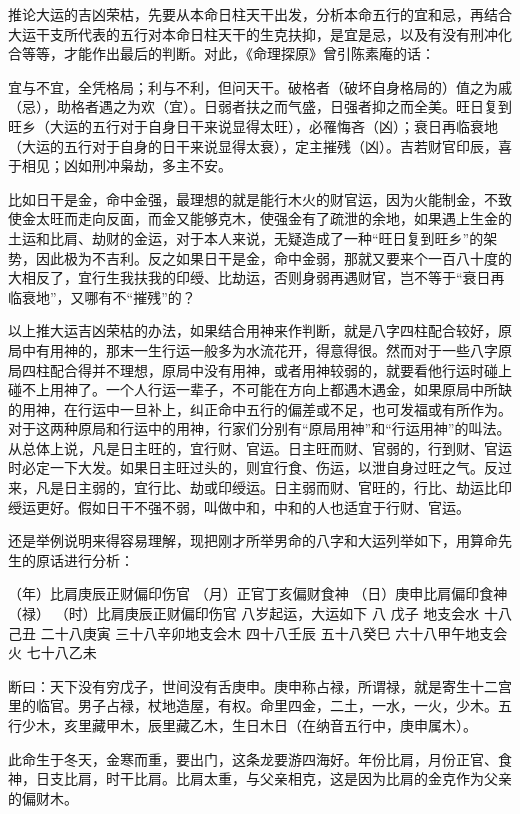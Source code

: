 \documentclass[a5paper,oneside,12pt]{ctexbook}
\newenvironment{yinyong}{%
    \begin{list}{}{\parsep\parskip
        \setlength\topsep{0pt}
        \setlength\itemindent{2em}%
        \setlength\parindent{2em}
        \setlength\listparindent{2em}
        \setlength{\leftmargin}{2em}
        \setlength{\rightmargin}{2em}
        \kaishu
    }
    \item[]
}{
  \end{list}
}
\begin{document}
推论大运的吉凶荣枯，先要从本命日柱天干出发，分析本命五行的宜和忌，再结合大运干支所代表的五行对本命日柱天干的生克扶抑，是宜是忌，以及有没有刑冲化合等等，才能作出最后的判断。对此，《命理探原》曾引陈素庵的话：
\begin{yinyong}
宜与不宜，全凭格局；利与不利，但问天干。破格者（破坏自身格局的）值之为戚（忌），助格者遇之为欢（宜）。日弱者扶之而气盛，日强者抑之而全美。旺日复到旺乡（大运的五行对于自身日干来说显得太旺），必罹悔吝（凶）；衰日再临衰地（大运的五行对于自身的日干来说显得太衰），定主摧残（凶）。吉若财官印辰，喜于相见；凶如刑冲枭劫，多主不安。  
\end{yinyong}
比如日干是金，命中金强，最理想的就是能行木火的财官运，因为火能制金，不致使金太旺而走向反面，而金又能够克木，使强金有了疏泄的余地，如果遇上生金的土运和比肩、劫财的金运，对于本人来说，无疑造成了一种“旺日复到旺乡”的架势，因此极为不吉利。反之如果日干是金，命中金弱，那就又要来个一百八十度的大相反了，宜行生我扶我的印绶、比劫运，否则身弱再遇财官，岂不等于“衰日再临衰地”，又哪有不“摧残”的？

以上推大运吉凶荣枯的办法，如果结合用神来作判断，就是八字四柱配合较好，原局中有用神的，那末一生行运一般多为水流花开，得意得很。然而对于一些八字原局四柱配合得并不理想，原局中没有用神，或者用神较弱的，就要看他行运时碰上碰不上用神了。一个人行运一辈子，不可能在方向上都遇木遇金，如果原局中所缺的用神，在行运中一旦补上，纠正命中五行的偏差或不足，也可发福或有所作为。对于这两种原局和行运中的用神，行家们分别有“原局用神”和“行运用神”的叫法。从总体上说，凡是日主旺的，宜行财、官运。日主旺而财、官弱的，行到财、官运时必定一下大发。如果日主旺过头的，则宜行食、伤运，以泄自身过旺之气。反过来，凡是日主弱的，宜行比、劫或印绶运。日主弱而财、官旺的，行比、劫运比印绶运更好。假如日干不强不弱，叫做中和，中和的人也适宜于行财、官运。

还是举例说明来得容易理解，现把刚才所举男命的八字和大运列举如下，用算命先生的原话进行分析：

（年）比肩庚辰正财偏印伤官
（月）正官丁亥偏财食神
（日）庚申比肩偏印食神（禄）
（时）比肩庚辰正财偏印伤官
八岁起运，大运如下
八	戊子 地支会水
十八己丑
二十八庚寅
三十八辛卯地支会木
四十八壬辰
五十八癸巳
六十八甲午地支会火
七十八乙未

断曰：天下没有穷戊子，世间没有舌庚申。庚申称占禄，所谓禄，就是寄生十二宫里的临官。男子占禄，杖地造屋，有权。命里四金，二土，一水，一火，少木。五行少木，亥里藏甲木，辰里藏乙木，生日木日（在纳音五行中，庚申属木）。

此命生于冬天，金寒而重，要出门，这条龙要游四海好。年份比肩，月份正官、食神，日支比肩，时干比肩。比肩太重，与父亲相克，这是因为比肩的金克作为父亲的偏财木。
\end{document}
